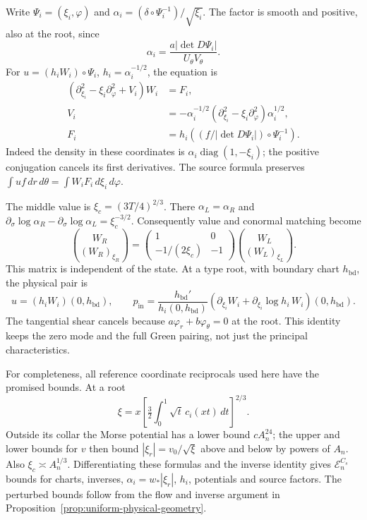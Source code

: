 Write $\Psi_i=(\xi_i,\varphi)$ and
$\alpha_i=(\delta\circ\Psi_i^{-1})/\sqrt{\xi_i}$.
The factor is smooth and positive, also at the root, since
\[
 \alpha_i=\frac{a|\det D\Psi_i|}{U_\theta V_\theta}.
\]
For $u=(h_iW_i)\circ\Psi_i$, $h_i=\alpha_i^{-1/2}$, the equation is
\begin{equation}\label{eq:fixed-strip-airy-equation}
 \begin{split}
 (\partial_{\xi_i}^2-\xi_i\partial_\varphi^2+V_i)W_i&=F_i,\\
 V_i&=-\alpha_i^{-1/2}
       (\partial_{\xi_i}^2-\xi_i\partial_\varphi^2)\alpha_i^{1/2},\\
 F_i&=h_i((f/|\det D\Psi_i|)\circ\Psi_i^{-1}).
 \end{split}
\end{equation}
Indeed the density in these coordinates is
$\alpha_i\operatorname{diag}(1,-\xi_i)$; the positive conjugation
cancels its first derivatives. The source formula preserves
$\int uf\,dr\,d\theta=\int W_iF_i\,d\xi_i\,d\varphi$.

The middle value is $\xi_c=(3T/4)^{2/3}$. There
$\alpha_L=\alpha_R$ and
$\partial_\sigma\log\alpha_R-\partial_\sigma\log\alpha_L
=\xi_c^{-3/2}$. Consequently value and conormal matching become
\begin{equation}\label{eq:fixed-strip-cut}
 \binom{W_R}{(W_R)_{\xi_R}}
 =\begin{pmatrix}1&0\\-1/(2\xi_c)&-1\end{pmatrix}
       \binom{W_L}{(W_L)_{\xi_L}}.
\end{equation}
This matrix is independent of the state. At a type root, with boundary
chart $h_{\mathrm{bd}}$, the physical pair is
\begin{equation}\label{eq:fixed-strip-root-pair}
 u=(h_iW_i)(0,h_{\mathrm{bd}}),\qquad
 p_{\mathrm{in}}=\frac{h_{\mathrm{bd}}'}{h_i(0,h_{\mathrm{bd}})}
       (\partial_{\xi_i}W_i+\partial_{\xi_i}\log h_i\,W_i)
                                             (0,h_{\mathrm{bd}}).
\end{equation}
The tangential shear cancels because $a\varphi_r+b\varphi_\theta=0$
at the root. This identity keeps the zero mode and the full Green
pairing, not just the principal characteristics.

For completeness, all reference coordinate reciprocals used here have
the promised bounds. At a root
\[
 \xi=x\left[\tfrac32\int_0^1\sqrt t\,c_i(xt)\,dt\right]^{2/3}.
\]
Outside its collar the Morse potential has a lower bound $cA_n^{24}$;
the upper and lower bounds for $v$ then bound
$|\xi_r|=v_0/\sqrt\xi$ above and below by powers of $A_n$.
Also $\xi_c\asymp A_n^{1/3}$. Differentiating these formulas and
the inverse identity gives $\mathcal E_n^{C_s}$ bounds for charts,
inverses, $\alpha_i=w_*|\xi_r|$, $h_i$, potentials and source
factors. The perturbed bounds follow from the flow and inverse
argument in Proposition~\ref{prop:uniform-physical-geometry}.

